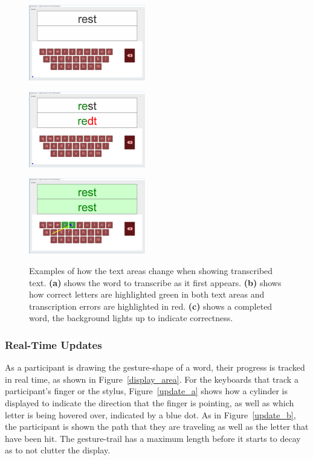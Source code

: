 \begin{figure}[h]
	\centering
	\begin{minipage}[t]{1.9in}
		\includegraphics[width=2in]{fig_idle_keyboard}
		\label{text_a}
	\end{minipage}
	\begin{minipage}[t]{1.9in}
		\includegraphics[width=2in]{fig_error_keyboard}
		\label{text_b}
	\end{minipage}
	\begin{minipage}[t]{1.9in}
		\includegraphics[width=2in]{fig_correct_keyboard}
		\label{text_c}
	\end{minipage}
	\caption[Display: Text Area]{Examples of how the text areas change when showing transcribed text. \textbf{(a)} shows the word to transcribe as it first appears. \textbf{(b)} shows how correct letters are highlighted green in both text areas and transcription errors are highlighted in red. \textbf{(c)} shows a completed word, the background lights up to indicate correctness.}
	\label{text_area}
\end{figure}

\subsubsection{Real-Time Updates}
As a participant is drawing the gesture-shape of a word, their progress is tracked in real time, as shown in Figure~\ref{display_area}. For the keyboards that track a participant's finger or the stylus, Figure~\ref{update_a} shows how a cylinder is displayed to indicate the direction that the finger is pointing, as well as which letter is being hovered over, indicated by a blue dot. As in Figure~\ref{update_b}, the participant is shown the path that they are traveling as well as the letter that have been hit. The gesture-trail has a maximum length before it starts to decay as to not clutter the display. 

